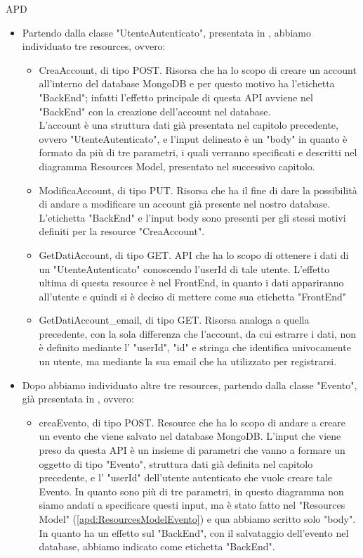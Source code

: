 \begin{listaPersonale} {APD}
\begin{listaPersonale2}[APD]{}
        \begin{itemize}
            \item Partendo dalla classe "UtenteAutenticato", presentata in , abbiamo individuato tre resources, ovvero:
                  \begin{itemize}
                      \item CreaAccount, di tipo POST. Risorsa che ha lo scopo di creare un account all'interno del database MongoDB e per questo motivo ha l'etichetta "BackEnd"; infatti l'effetto principale di questa API avviene nel "BackEnd" con la creazione dell'account nel database.\\ L'account è una struttura dati già presentata nel capitolo precedente, ovvero "UtenteAutenticato", e l'input delineato è un "body" in quanto è formato da più di tre parametri, i quali verranno specificati e descritti nel diagramma Resources Model, presentato nel successivo capitolo.
                      \item ModificaAccount, di tipo PUT. Risorsa che ha il fine di dare la possibilità di andare a modificare un account già presente nel nostro database. L'etichetta "BackEnd" e l'input body sono presenti per gli stessi motivi definiti per la resource "CreaAccount".
                      \item GetDatiAccount, di tipo GET. API che ha lo scopo di ottenere i dati di un "UtenteAutenticato" conoscendo l'userId di tale utente. L'effetto ultima di questa resource è nel FrontEnd, in quanto i dati appariranno all'utente e quindi si è deciso di mettere come sua etichetta "FrontEnd"
                      \item GetDatiAccount\_email, di tipo GET. Risorsa analoga a quella precedente, con la sola differenza che l'account, da cui estrarre i dati, non è definito mediante l' "userId", "id" e stringa che identifica univocamente un utente, ma mediante la sua email che ha utilizzato per registrarsi.
                  \end{itemize}
            \item Dopo abbiamo individuato altre tre resources, partendo dalla classe "Evento", già presentata in , ovvero:
                  \begin{itemize}
                      \item creaEvento, di tipo POST. Resource che ha lo scopo di andare a creare un evento che viene salvato nel database MongoDB. L'input che viene preso da questa API è un insieme di parametri che vanno a formare un oggetto di tipo "Evento", struttura dati già definita nel capitolo precedente, e l' "userId" dell'utente autenticato che vuole creare tale Evento. In quanto sono più di tre parametri, in questo diagramma non siamo andati a specificare questi input, ma è stato fatto nel "Resources Model" (\ref{apd:ResourcesModelEvento}) e qua abbiamo scritto solo "body". In quanto ha un effetto sul "BackEnd", con il salvataggio dell'evento nel database, abbiamo indicato come etichetta "BackEnd".

\end{itemize}
\end{itemize}
\end{listaPersonale2}
\end{listaPersonale}
